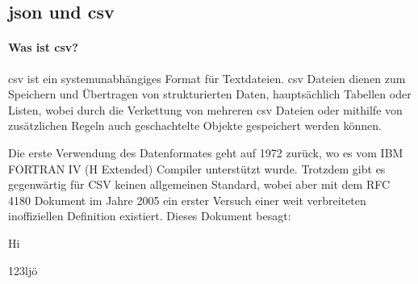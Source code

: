 \subsection{\acs{json} und \acs{csv}}
\paragraph{Was ist \acs{csv}?}
\acf{csv} ist ein systemunabhängiges Format für Textdateien. \acs{csv} Dateien dienen zum Speichern und Übertragen von strukturierten Daten, hauptsächlich Tabellen oder Listen, wobei durch die Verkettung von mehreren \acs{csv} Dateien oder mithilfe von zusätzlichen Regeln auch geschachtelte Objekte gespeichert werden können. \cite{Fuchs Media Solutions:o.J.}

Die erste Verwendung des Datenformates geht auf 1972 zurück, wo es vom IBM FORTRAN IV (H Extended) Compiler unterstützt wurde. Trotzdem gibt es gegenwärtig für CSV keinen allgemeinen Standard, wobei aber mit dem RFC 4180 Dokument \cite{Shafranovich:2005} im Jahre 2005 ein erster Versuch einer weit verbreiteten inoffiziellen Definition existiert. Dieses Dokument besagt:
\begin{list}{}{}
	\item Hi
	\item 123ljö
\end{list}
